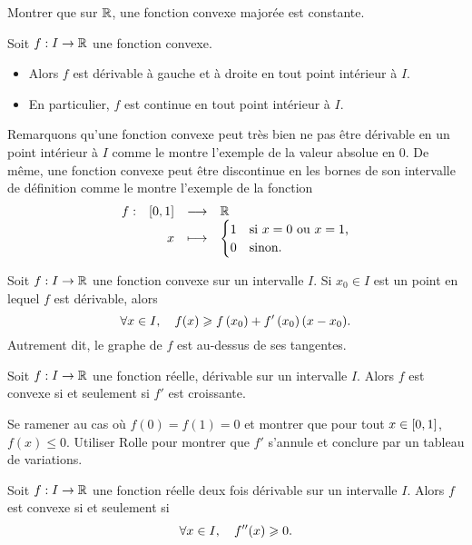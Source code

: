 \documentclass{magnolia}
\begin{document}
\begin{exos}
\exo Montrer que sur $\mathbb{R}$, une fonction convexe majorée est constante.
\end{exos}

\begin{proposition}
Soit $f:I\to\mathbb{R}$ une fonction convexe.
\begin{itemize}
\item Alors $f$ est dérivable à gauche et à droite en tout point intérieur à $I$.
\item En particulier, $f$ est continue en tout point intérieur à $I$.
\end{itemize}
\end{proposition}

\begin{remarqueUnique}
  \remarque 
  Remarquons qu'une fonction convexe peut
  très bien ne pas être dérivable en un point intérieur à $I$ comme le montre
  l'exemple de la valeur absolue en 0. De même, une fonction convexe peut
  être discontinue en les bornes de son intervalle de définition comme le
  montre l'exemple de la fonction
  \[\begin{array}[t]{lrcl} \displaystyle{f} : & \displaystyle{\left[0,1\right]} & \longrightarrow & \displaystyle{\mathbb{R}} \\ & \displaystyle{x} & \longmapsto & \displaystyle{
    \begin{cases}
    1 & \text{si $x=0$ ou $x=1$,}\\
    0 & \text{sinon.}  
    \end{cases}} \end{array}\]
\end{remarqueUnique}

\begin{proposition}[utile=-3]
Soit $f:I\to\mathbb{R}$ une fonction convexe sur un intervalle $I$. Si $x_0\in I$ est un point
en lequel $f$ est dérivable, alors
\[\forall x\in I,\quad f(x)\geqslant f\left(x_0\right)+f'\left(x_0\right)(x-x_0).\]
Autrement dit, le graphe de $f$ est au-dessus de ses tangentes.
\end{proposition}



\begin{proposition}[utile=-3]
Soit $f:I\to\mathbb{R}$ une fonction réelle, dérivable sur un intervalle $I$. Alors
$f$ est convexe si et seulement si $f'$ est croissante.
\end{proposition}
\begin{preuve}
Se ramener au cas où $f(0)=f(1)=0$ et montrer que pour tout
$x\in\left[0,1\right]$, $f(x)\leq 0$. Utiliser Rolle pour montrer que $f'$ s'annule
et conclure par un tableau de variations.
\end{preuve}

\begin{proposition}[utile=-3]
Soit $f:I\to\mathbb{R}$ une fonction réelle deux fois dérivable sur un intervalle $I$. Alors
$f$ est convexe si et seulement si
\[\forall x\in I ,\quad f''(x)\geqslant 0.\]
\end{proposition}
\end{document}
